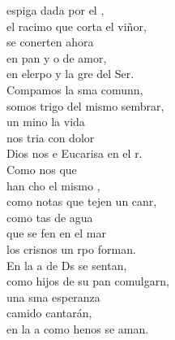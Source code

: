 \begin{cancion}%
	 espiga dada por el ,\\
	el racimo que corta el viñor,\\
	se conerten ahora\\
	en pan y o de amor,\\
	en elerpo y la gre del Ser.\\
\jump
	Compamos la sma comunn,\\
	somos trigo del mismo sembrar,\\
	un mino la vida \\
	nos tria con dolor\\
	Dios nos e Eucarisa en el r.\\
\jump
	Como nos que \\
	han cho el mismo ,\\
	como notas que tejen un canr,\\
	como tas de agua \\
	que se fen en el mar\\
	los crisnos un rpo forman.\\
\jump
	En la a de Ds se sentan,\\
	como hijos de su pan comulgarn,\\
	una sma esperanza \\
	camido cantarán,\\
	en la a como henos se aman.\\
\end{cancion}%
